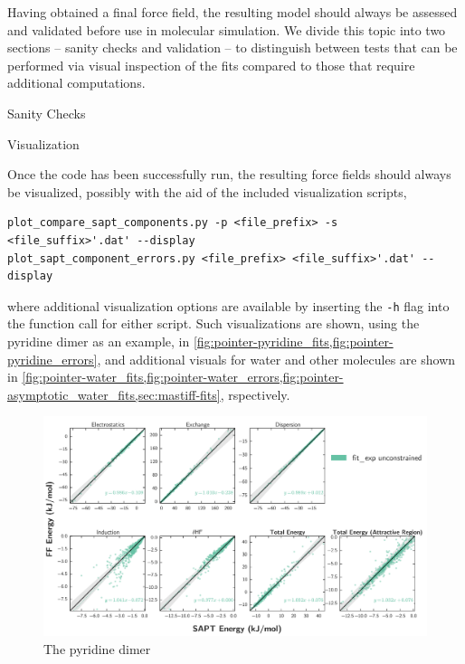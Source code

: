 Having obtained a final force field, the resulting model should always be
assessed and validated before use in molecular simulation. We divide this
topic into two sections -- sanity checks and validation -- to distinguish
between tests that can be performed via visual inspection of the fits compared
to those that require additional computations.

\begin{subsection}{Sanity Checks}

\begin{paragraph}{Visualization}

Once the \pointer code has been successfully run, the resulting force fields
should always be visualized, possibly with the aid of the included
visualization scripts,

\begin{lstlisting}
plot_compare_sapt_components.py -p <file_prefix> -s <file_suffix>'.dat' --display
plot_sapt_component_errors.py <file_prefix> <file_suffix>'.dat' --display
\end{lstlisting}

where additional visualization options are available by inserting the \verb|-h|
flag into the function call for either script. Such visualizations are shown,
using the pyridine dimer as an example, in
\cref{fig:pointer-pyridine_fits,fig:pointer-pyridine_errors}, and additional
visuals for water and other molecules are shown in
\cref{fig:pointer-water_fits,fig:pointer-water_errors,fig:pointer-asymptotic_water_fits,sec:mastiff-fits},
rspectively.

\begin{figure}
\centering
\includegraphics[width=\textwidth]{pointer/pyridine/sapt_comparison.pdf}
\caption[Comparison with the pyridine dimer]
{The pyridine dimer}
\label{fig:pointer-pyridine_fits}
\end{figure}


\end{paragraph}
\end{subsection}

